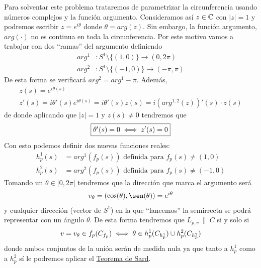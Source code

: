 Para solventar este problema trataremos de parametrizar la circunferencia usando números complejos y la función argumento. Consideramos así $z\in \mathbb{C}$ con $|z|=1$ y podremos escribir $z = e^{i\theta}$ donde $\theta = arg(z)$. Sin embargo, la función argumento, $arg(\cdot)$ no es continua en toda la circunferencia. Por este motivo vamos a trabajar con dos ``ramas'' del argumento definiendo
\begin{align*}
    arg^1 &: S^1 \setminus \{(1,0)\} \to (0,2\pi)\\
    arg^2 &: S^1 \setminus \{(-1,0)\} \to (-\pi,\pi)
\end{align*}
De esta forma se verificará $arg^2 = arg^1 - \pi$. Además, 
\begin{gather*}
    z(s) = e^{i\theta(s)}\\
    z'(s) = i\theta'(s)e^{i\theta(s)} = i\theta'(s)z(s) = i(arg^{1,2}(z))'(s) \cdot z(s)
\end{gather*}
de donde aplicando que $|z| = 1$ y $z(s) \neq 0$ tendremos que 
\begin{gather*}
    \boxed{\theta'(s) = 0 \iff z'(s) = 0}
\end{gather*}
Con esto podemos definir dos nuevas funciones reales:
\begin{align*}
    h^1_p(s) &= arg^1 (f_p(s)) \text{ definida para } f_p(s) \neq (1,0)\\
    h^2_p(s) &= arg^2 (f_p(s)) \text{ definida para } f_p(s) \neq (-1,0)
\end{align*}
Tomando un $\theta\in [0,2\pi[$ tendremos que la dirección que marca el argumento será 
\begin{gather*}
    v_\theta = (\cos(\theta), \sen(\theta)) = e^{i\theta}
\end{gather*}
y cualquier dirección (vector de $S^1$) en la que ``lancemos'' la semirrecta se podrá representar con un ángulo $\theta$. De esta forma tendremos que $L_{p,v} \ \| \ C$ si y solo si 
\begin{gather*}
    v=v_\theta \in f_p(C_{f_p}) \iff \theta \in h_p^1(C_{h_p^1}) \cup h_p^2(C_{h_p^2})
\end{gather*}
donde ambos conjuntos de la unión serán de medida nula ya que tanto a $h_p^1$ como a $h_p^2$ sí le podremos aplicar el \hyperref[teo:sard]{Teorema de Sard}.\\

